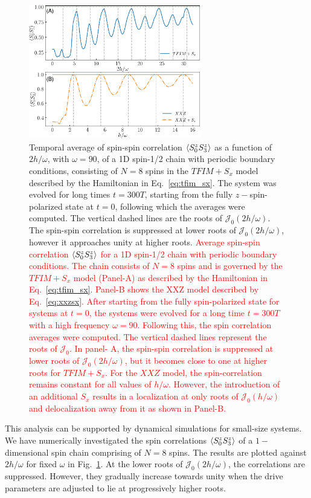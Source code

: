 \documentclass[%
reprint,
superscriptaddress,
amsmath,amssymb,
aps,
prb,
showkeys,
]{revtex4-2}
\newcommand{\red}[1]{\textcolor{red}{#1}}
\begin{document}
	\begin{figure}[ht!]
		\centering
		\includegraphics[width = 7.5cm]{corrN8sz0sz3avg_tfim_sx_xxz_sx.pdf}
		\caption{Temporal average of spin-spin correlation $\expval{S^z_0 S^z_3}$ as a function of $2h/\omega$, with $\omega=90$, of a 1D spin-1/2 chain with periodic boundary conditions, consisting of $N=8$ spins in the $TFIM+S_x$ model described by the Hamiltonian in Eq.~\ref{eq:tfim_sx}. The system was evolved for long times $t=300T$, starting from the fully $z-$spin-polarized state at $t=0$,  following which the averages were computed.  The  vertical dashed lines are the roots of $\mathcal{J}_0\left(2h/\omega\right)$. The spin-spin correlation is suppressed at lower roots  of $\mathcal{J}_0\left(2h/\omega\right)$, however it approaches unity at higher roots. \red{Average spin-spin correlation $\expval{S^z_0 S^z_3}$ for a 1D spin-1/2 chain with periodic boundary conditions. The chain consists of $N=8$ spins and is governed by the $TFIM+S_x$ model (Panel-A) as described by the Hamiltonian in Eq.~\ref{eq:tfim_sx}. Panel-B shows the XXZ model described by Eq.~\eqref{eq:xxzsx}. After starting from the fully spin-polarized state for systems at $t=0$, the systems were evolved for a long time $t=300T$ with a high frequency $\omega=90$. Following this, the spin correlation averages were computed.  The vertical dashed lines represent the roots of $\mathcal{J}_0$. In panel- A, the spin-spin correlation is suppressed at lower roots of $\mathcal{J}_0\left(2h/\omega\right)$, but it becomes close to one at higher roots for $TFIM+S_x$. For the $XXZ$ model, the spin-correlation remains constant for all values of $h/\omega$. However, the introduction of an additional $S_x$ results in a localization at only roots of $\mathcal{J}_0\left(h/\omega\right)$ and delocalization away from it as shown in Panel-B.}
		}
		\label{fig:ipr:tfimsx}
	\end{figure}
	This analysis can be supported by dynamical simulations for small-size systems. We have numerically investigated the spin correlations $\expval{S^z_0 S^z_3}$ of a $1-$dimensional spin chain comprising of $N=8$ spins. The results are plotted against $2h/\omega$ for fixed $\omega$ in Fig.~\ref{fig:ipr:tfimsx}. At the lower roots of $\mathcal{J}_0\left(2h/\omega\right)$,  the correlations are suppressed. However,  they  gradually increase towards unity when the drive parameters are adjusted to lie at progressively higher roots.
	
\end{document}
